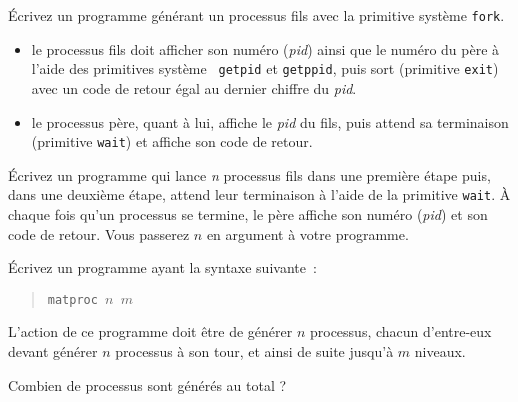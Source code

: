 %


% 


\question

Écrivez un programme générant un processus fils avec la primitive
système {\tt fork}.

\begin {itemize}
    \item le processus fils doit afficher son numéro ({\em pid}) ainsi
	que le numéro du père à l'aide des primitives système {\tt
	getpid} et {\tt getppid}, puis sort (primitive {\tt exit}) avec
	un code de retour égal au dernier chiffre du {\em pid}.

    \item le processus père, quant à lui, affiche le {\em pid} du fils,
	puis attend sa terminaison (primitive {\tt wait}) et affiche son
	code de retour.

\end {itemize}


\question

Écrivez un programme qui lance {\em n} processus fils dans une
première étape puis, dans une deuxième étape, attend leur terminaison
à l'aide de la primitive {\tt wait}.
\`A chaque fois qu'un processus se termine,
le père affiche son numéro ({\em pid}) et son code de retour.
Vous passerez $n$ en argument à votre programme.


\question

Écrivez un programme ayant la syntaxe suivante~:

\vspace* {-3mm}
\begin {quote}
{\tt matproc $n$ $m$}
\end {quote}

L'action de ce programme doit être de générer $n$ processus, chacun
d'entre-eux devant générer $n$ processus à son tour, et ainsi de suite
jusqu'à $m$ niveaux.

Combien de processus sont générés au total ?

\question


